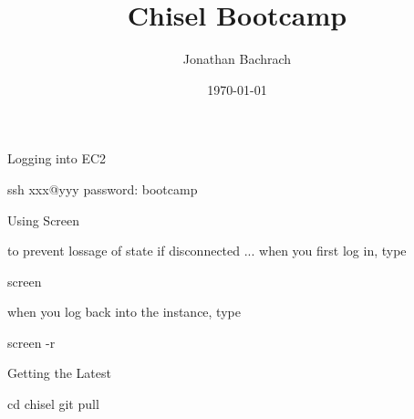 \documentclass[xcolor=pdflatex,dvipsnames,table]{beamer}
\title{Chisel Bootcamp}
\author{Jonathan Bachrach}
\date{\today}
\institute[UC Berkeley]{EECS UC Berkeley}
\begin{document}
\begin{frame}
\titlepage
\end{frame}
\addtocounter{framenumber}{-1}

% 
% 
% 

\begin{frame}[fragile]{Logging into EC2}

\begin{scala}
ssh xxx@yyy
password: bootcamp
\end{scala}

\end{frame}

\begin{frame}[fragile]{Using Screen}

to prevent lossage of state if disconnected ... when you first log in, type
\begin{scala}
screen
\end{scala}

when you log back into the instance, type
\begin{scala}
screen -r
\end{scala}

\end{frame}

\begin{frame}[fragile]{Getting the Latest}

\begin{scala}
cd chisel
git pull
\end{scala}

\end{frame}
\end{document}
